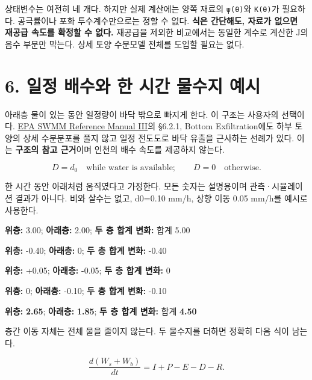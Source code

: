 \documentclass[11pt,a4paper]{article}
\begin{document}
상태변수는 여전히 네 개다. 하지만 실제 계산에는 양쪽 재료의 \texttt{ψ(θ)}와 \texttt{K(θ)}가 필요하다. 공극률이나 포화 투수계수만으로는 정할 수 없다. \textbf{식은 간단해도, 자료가 없으면 재공급 속도를 확정할 수 없다.} 재공급을 제외한 비교에서는 동일한 계수로 계산한 J의 음수 부분만 막는다. 상세 토양 수분모델 전체를 도입할 필요는 없다.

\section{6. 일정 배수와 한 시간 물수지 예시}

아래층 물이 있는 동안 일정량이 바닥 밖으로 빠지게 한다. 이 구조는 사용자의 선택이다. \href{\detokenize{https://nepis.epa.gov/Exe/ZyPURL.cgi?Dockey=P100P2NY.TXT}}{EPA SWMM Reference Manual III}의 §6.2.1, Bottom Exfiltration에도 하부 토양의 상세 수분분포를 풀지 않고 일정 전도도로 바닥 유출을 근사하는 선례가 있다. 이는 \textbf{구조의 참고 근거}이며 인천의 배수 속도를 제공하지 않는다.

\begin{equation*}
D=d_0\quad\text{while water is available};\qquad D=0\quad\text{otherwise}.\tag{W4}
\end{equation*}

한 시간 동안 아래처럼 움직였다고 가정한다. 모든 숫자는 설명용이며 관측·시뮬레이션 결과가 아니다. 비와 살수는 없고, d0=0.10 mm/h, 상향 이동 0.05 mm/h를 예시로 사용한다.

\begin{description}[leftmargin=0pt,style=nextline]
\item[처음 물] \textbf{위층:} 3.00; \textbf{아래층:} 2.00; \textbf{두 층 합계 변화:} 합계 5.00
\item[표면 증발] \textbf{위층:} -0.40; \textbf{아래층:} 0; \textbf{두 층 합계 변화:} -0.40
\item[아래에서 위로 이동] \textbf{위층:} +0.05; \textbf{아래층:} -0.05; \textbf{두 층 합계 변화:} 0
\item[바닥 배수] \textbf{위층:} 0; \textbf{아래층:} -0.10; \textbf{두 층 합계 변화:} -0.10
\item[한 시간 뒤 물] \textbf{위층:} \textbf{2.65}; \textbf{아래층:} \textbf{1.85}; \textbf{두 층 합계 변화:} 합계 \textbf{4.50}
\end{description}

층간 이동 자체는 전체 물을 줄이지 않는다. 두 물수지를 더하면 정확히 다음 식이 남는다.

\begin{equation*}
\frac{d(W_s+W_b)}{dt}=I+P-E-D-R.\tag{W5}
\end{equation*}
\end{document}
